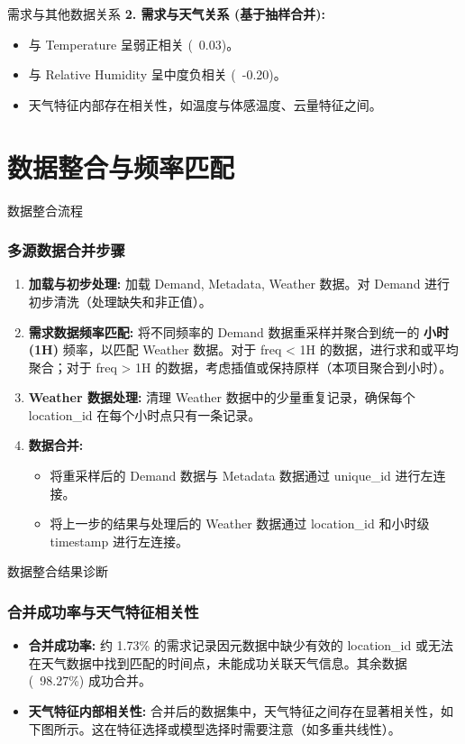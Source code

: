 \documentclass{beamer} %
\begin{document}
\begin{frame}{需求与其他数据关系}
    \textbf{2. 需求与天气关系 (基于抽样合并):}
    \begin{itemize}
        \item 与 Temperature 呈弱正相关 (~0.03)。
        \item 与 Relative Humidity 呈中度负相关 (~-0.20)。
        \item 天气特征内部存在相关性，如温度与体感温度、云量特征之间。
    \end{itemize}
\end{frame}

\section{数据整合与频率匹配}

\begin{frame}{数据整合流程}
    \frametitle{多源数据合并步骤}
    \begin{enumerate}
        \item \textbf{加载与初步处理:} 加载 Demand, Metadata, Weather 数据。对 Demand 进行初步清洗（处理缺失和非正值）。
        \item \textbf{需求数据频率匹配:} 将不同频率的 Demand 数据重采样并聚合到统一的 \textbf{小时 (1H)} 频率，以匹配 Weather 数据。对于 freq < 1H 的数据，进行求和或平均聚合；对于 freq > 1H 的数据，考虑插值或保持原样（本项目聚合到小时）。
        \item \textbf{Weather 数据处理:} 清理 Weather 数据中的少量重复记录，确保每个 location\_id 在每个小时点只有一条记录。
        \item \textbf{数据合并:}
        \begin{itemize}
            \item 将重采样后的 Demand 数据与 Metadata 数据通过 unique\_id 进行左连接。
            \item 将上一步的结果与处理后的 Weather 数据通过 location\_id 和小时级 timestamp 进行左连接。
        \end{itemize}
    \end{enumerate}
\end{frame}

\begin{frame}{数据整合结果诊断}
    \frametitle{合并成功率与天气特征相关性}
    \begin{itemize}
        \item \textbf{合并成功率:} 约 1.73\% 的需求记录因元数据中缺少有效的 location\_id 或无法在天气数据中找到匹配的时间点，未能成功关联天气信息。其余数据 (~98.27\%) 成功合并。
        \item \textbf{天气特征内部相关性:} 合并后的数据集中，天气特征之间存在显著相关性，如下图所示。这在特征选择或模型选择时需要注意（如多重共线性）。
    \end{itemize}
\end{frame}
\end{document}
